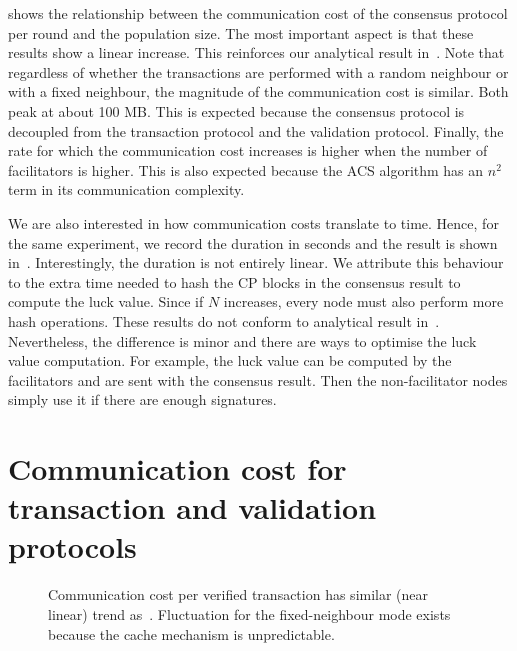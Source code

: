  shows the relationship between the communication cost of the consensus protocol per round and the population size.
The most important aspect is that these results show a linear increase.
This reinforces our analytical result in~.
Note that regardless of whether the transactions are performed with a random neighbour or with a fixed neighbour,
the magnitude of the communication cost is similar.
Both peak at about 100 MB.
This is expected because the consensus protocol is decoupled from the transaction protocol and the validation protocol.
Finally, the rate for which the communication cost increases is higher when the number of facilitators is higher.
This is also expected because the ACS algorithm has an $n^2$ term in its communication complexity.

We are also interested in how communication costs translate to time.
Hence, for the same experiment, we record the duration in seconds and the result is shown in~.
Interestingly, the duration is not entirely linear.
We attribute this behaviour to the extra time needed to hash the CP blocks in the consensus result to compute the luck value.
Since if $N$ increases, every node must also perform more hash operations.
These results do not conform to analytical result in~.
Nevertheless, the difference is minor and there are ways to optimise the luck value computation.
For example, the luck value can be computed by the facilitators and are sent with the consensus result.
Then the non-facilitator nodes simply use it if there are enough signatures.

\section{Communication cost for transaction and validation protocols}

\begin{figure}[h]
  \centering
  \caption{Communication cost per verified transaction has similar (near linear) trend as~.
  Fluctuation for the fixed-neighbour mode exists because the cache mechanism is unpredictable.}
  \label{fig:tx-comms}
\end{figure}

